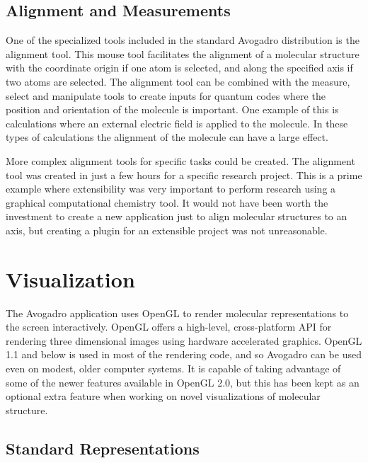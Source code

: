 \documentclass[10pt]{bmc_article}
\newenvironment{bmcformat}{\begin{raggedright}
\baselineskip20pt\sloppy\setboolean{publ}{false}}{\end{raggedright}
\baselineskip20pt\sloppy}
\begin{document}
\begin{bmcformat}
\subsection{Alignment and Measurements}

One of the specialized tools included in the standard Avogadro distribution is
the alignment tool. This mouse tool facilitates the alignment of a molecular
structure with the coordinate origin if one atom is selected, and along the
specified axis if two atoms are selected. The alignment tool can be combined
with the measure, select and manipulate tools to create inputs for
quantum codes where the position and orientation of the molecule is important.
One example of this is calculations where an external electric field is applied
to the molecule. In these types of calculations the alignment of the molecule
can have a large effect.

More complex alignment tools for specific tasks could be created. The alignment
tool was created in just a few hours for a specific research project. This is a prime
example where extensibility was very important to perform
research using a graphical computational chemistry tool. It would not have been
worth the investment to create a new application just to align molecular
structures to an axis, but creating a plugin for an extensible project was not
unreasonable.


\section{Visualization}

The Avogadro application uses OpenGL to render molecular representations to the
screen interactively. OpenGL offers a high-level, cross-platform API for rendering
three dimensional images using hardware accelerated graphics. OpenGL
1.1 and below is used in most of the rendering code, and so Avogadro can be used
even on modest, older computer systems. It is capable of taking advantage of
some of the newer features available in OpenGL 2.0, but this has been kept as an
optional extra feature when working on novel visualizations of molecular
structure.

\subsection{Standard Representations}


\end{bmcformat}
\end{document}
